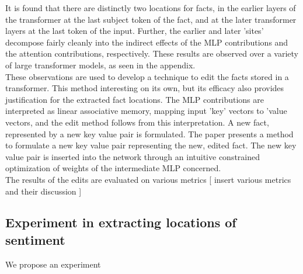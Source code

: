 \documentclass[10pt,a4paper]{report}
\begin{document}
It is found that there are distinctly two locations for facts, in the earlier layers of the transformer at the last subject token of the fact, and at the later transformer layers  at the last token of the input. 
Further, the earlier and later 'sites' decompose fairly cleanly into the indirect effects of the MLP contributions and the attention contributions, respectively.
These results are observed over a variety of large transformer models, as seen in the appendix.\\
These observations are used to develop a technique to edit the facts stored in a transformer.
This method interesting on its own, but its efficacy also provides justification for the extracted fact locations. 
The MLP contributions are interpreted as linear associative memory, mapping input 'key' vectors to 'value vectors, and the edit method follows from this interpretation.
A new fact, represented by a new key value pair is formulated. The paper presents a method to formulate a new key value pair representing the new, edited fact.
The new key value pair is inserted into the network through an intuitive constrained optimization of weights of the intermediate MLP concerned.
\\
The results of the edits are evaluated on various metrics 
[ insert various metrics and their discussion ]


\subsection{Experiment in extracting locations of sentiment}
We propose an experiment 
\end{document}
